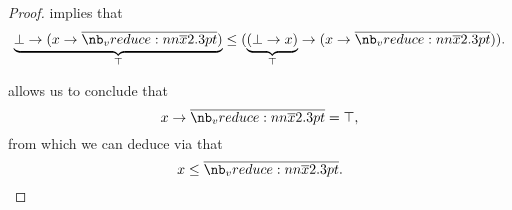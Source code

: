\begin{proof}
   implies that
  \begin{equation*}
    \underbrace{\bot \rightarrow (x \rightarrow \doline{x})}_\top \leq (\underbrace{(\bot \rightarrow x)}_\top \rightarrow (x \rightarrow \doline{x})).
  \end{equation*}

   allows us to conclude that
  \begin{equation*}
    x \rightarrow \doline{x} = \top,
  \end{equation*}
  from which we can deduce via  that
  \begin{equation*}
    x \leq \doline{x}.
  \end{equation*}
\end{proof}

